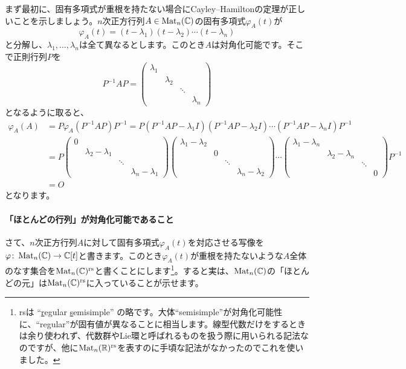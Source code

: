 まず最初に、固有多項式が重根を持たない場合にCayley--Hamiltonの定理が正しいことを示しましょう。$n$次正方行列$A \in \operatorname{Mat}_n(\mathbb{C})$の固有多項式$\varphi_A(t)$が
\[
\varphi_A(t) = (t - \lambda_1) (t - \lambda_2) \cdots (t - \lambda_n)
\]
と分解し、$\lambda_1, \ldots, \lambda_n$は全て異なるとします。このとき$A$は対角化可能です。そこで正則行列$P$を
\[
P^{-1} A P = 
\begin{pmatrix}
\lambda_1 \\
& \lambda_2 \\
& & \ddots \\
& & & \lambda_n
\end{pmatrix}
\]
となるように取ると、
\begin{align*}
\varphi_A(A) &= P \varphi_A(P^{-1} A P ) P^{-1}
= P (P^{-1} A P - \lambda_1 I) (P^{-1} A P - \lambda_2 I) \cdots (P^{-1} A P - \lambda_n I) P^{-1} \\
&= 
P 
\begin{pmatrix}
0 \\
& \lambda_2 - \lambda_1 \\
& & \ddots \\
& & & \lambda_n - \lambda_1
\end{pmatrix}
\begin{pmatrix}
\lambda_1 - \lambda_2 \\
& 0 \\
& & \ddots \\
& & & \lambda_n - \lambda_2
\end{pmatrix}
\cdots
\begin{pmatrix}
\lambda_1 - \lambda_n \\
& \lambda_2 - \lambda_n \\
& & \ddots \\
& & & 0
\end{pmatrix}
P^{-1} \\
&= O
\end{align*}
となります。

\paragraph{「ほとんどの行列」が対角化可能であること}

さて、$n$次正方行列$A$に対して固有多項式$\varphi_A(t)$を対応させる写像を$\varphi\colon \operatorname{Mat}_n(\mathbb{C}) \rightarrow \mathbb{C}[t]$と書きます。このとき$\varphi_A(t)$が重根を持たないような$A$全体のなす集合を$\operatorname{Mat}_n(\mathbb{C})^{\text{rs}}$と書くことにします\footnote{rsは ``\uline{r}egular \uline{s}emisimple'' の略です。大体``semisimple''が対角化可能性に、``regular''が固有値が異なることに相当します。線型代数だけをするときは余り使われず、代数群やLie環と呼ばれるものを扱う際に用いられる記法なのですが、他に$\operatorname{Mat}_n(\mathbb{R})^{\text{rs}}$を表すのに手頃な記法がなかったのでこれを使いました。}。すると実は、$\operatorname{Mat}_n(\mathbb{C})$の「ほとんどの元」は$\operatorname{Mat}_n(\mathbb{C})^{\text{rs}}$に入っていることが示せます。


